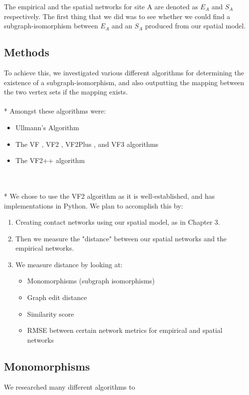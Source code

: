 The empirical and the spatial networks for site A are denoted as $E_A$ and $S_A$ respectively. The first thing that we did was to see whether we could find a subgraph-isomorphism between $E_A$ and an $S_A$ produced from our spatial model. 
\subsection{Methods}
To achieve this, we investigated various different algorithms for determining the existence of a subgraph-isomorphism, and also outputting the mapping between the two vertex sets if the mapping exists. 
\\\\* Amongst these algorithms were:
\begin{itemize}
    \item Ullmann's Algorithm \cite{Ullmann1976}
    \item The VF \cite{cordella1999performance}, VF2 \cite{Vento2004}, VF2Plus \cite{Carletti2015}, and VF3 \cite{carletti2017introducing} algorithms
    \item The VF2++ algorithm \cite{Juttner2018}
\end{itemize}
\\\\* We chose to use the VF2 algorithm as it is well-established, and has implementations in Python. 
We plan to accomplish this by:
\begin{enumerate}
    \item Creating contact networks using our spatial model, as in Chapter 3.
    \item Then we measure the "distance" between our spatial networks and the empirical networks.
    \item We measure distance by looking at:
    \begin{itemize}
        \item Monomorphisms (subgraph isomorphisms)
        \item Graph edit distance
        \item Similarity score
        \item RMSE between certain network metrics for empirical and spatial networks
    \end{itemize}
\end{enumerate}

\subsection{Monomorphisms}
We researched many different algorithms to 